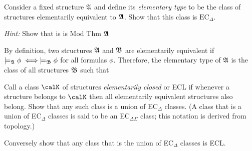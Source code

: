 \begin{problem}[26]
  \begin{enumalph}
    \item Consider a fixed structure $\mathfrak{A}$ and define its \emph{elementary type}
      to be the class of structures elementarily equivalent to $\mathfrak{A}$.
      Show that this class is $\text{EC}_{\Delta}$.

      \step
      \emph{Hint:} Show that is is Mod Thm $\mathfrak{A}$
      \begin{Answer}
        By definition, two structures $\mathfrak{A}$ and $\mathfrak{B}$ are elementarily equivalent
        if $\models_{\mathfrak{A}} \phi \;\Longleftrightarrow\; \models_{\mathfrak{B}} \phi$ for all formulas $\phi$.
        Therefore, the elementary type of $\mathfrak{A}$ is the class of all structures $\mathfrak{B}$
        such that 
      \end{Answer}

    \item Call a class $\calK$ of structures \emph{elementarily closed} or ECL
      if whenever a structure belongs to $\calK$ then all elementarily equivalent
      structures also belong.
      Show that any such class is a union of EC$_\Delta$ classes.
      (A class that is a union of EC$_\Delta$ classes is said to be an EC$_{\Delta \Sigma}$ class;
      this notation is derived from topology.)

    \item Conversely show that any class that is the union of EC$_\Delta$ classes
      is ECL.
    

  \end{enumalph}
\end{problem}
